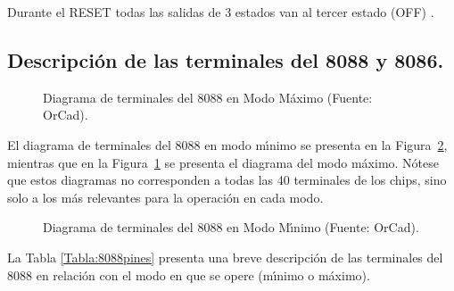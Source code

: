 Durante el RESET todas las salidas de 3 estados van al tercer estado (OFF) \cite{Intel:Micro}. 


\subsection{Descripci\'on de las terminales del 8088 y 8086.}
\label{Subseccion:terminales}

\begin{figure}[!htb]
\vskip 5mm
\vskip 100mm
\caption{Diagrama de terminales del 8088 en Modo M\'aximo ({\tiny Fuente: OrCad}).} 
\label{8088max}
\end{figure}

El diagrama de terminales del 8088 en modo m\'{\i}nimo se presenta en la %
Figura~\ref{8088min}, mientras que en la Figura~\ref{8088max} se presenta el diagrama del %
modo m\'aximo. N\'otese que estos diagramas no corresponden a todas las 40 terminales de los %
chips, sino solo a los m\'as relevantes para la operaci\'on en cada modo. 

\begin{figure}[!htb]
\vskip 5mm
\vskip 100mm
\caption{Diagrama de terminales del 8088 en Modo M\'{\i}nimo ({\tiny Fuente: OrCad}).} 
\label{8088min}
\end{figure}

La Tabla \ref{Tabla:8088pines} presenta una breve descripci\'on de las terminales del 8088 en %
relaci\'on con el modo en que se opere (m\'{\i}nimo o m\'aximo). 

